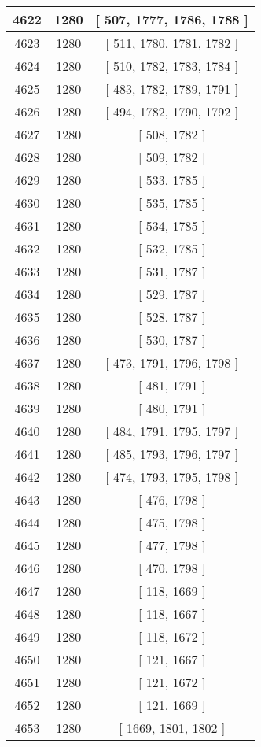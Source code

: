 \begin{center}
\begin{longtable}[H]{|| c c c ||}
4622 & 1280 & [ 507, 1777, 1786, 1788 ] \\ 
\hline
4623 & 1280 & [ 511, 1780, 1781, 1782 ] \\ 
\hline
4624 & 1280 & [ 510, 1782, 1783, 1784 ] \\ 
\hline
4625 & 1280 & [ 483, 1782, 1789, 1791 ] \\ 
\hline
4626 & 1280 & [ 494, 1782, 1790, 1792 ] \\ 
\hline
4627 & 1280 & [ 508, 1782 ] \\ 
\hline
4628 & 1280 & [ 509, 1782 ] \\ 
\hline
4629 & 1280 & [ 533, 1785 ] \\ 
\hline
4630 & 1280 & [ 535, 1785 ] \\ 
\hline
4631 & 1280 & [ 534, 1785 ] \\ 
\hline
4632 & 1280 & [ 532, 1785 ] \\ 
\hline
4633 & 1280 & [ 531, 1787 ] \\ 
\hline
4634 & 1280 & [ 529, 1787 ] \\ 
\hline
4635 & 1280 & [ 528, 1787 ] \\ 
\hline
4636 & 1280 & [ 530, 1787 ] \\ 
\hline
4637 & 1280 & [ 473, 1791, 1796, 1798 ] \\ 
\hline
4638 & 1280 & [ 481, 1791 ] \\ 
\hline
4639 & 1280 & [ 480, 1791 ] \\ 
\hline
4640 & 1280 & [ 484, 1791, 1795, 1797 ] \\ 
\hline
4641 & 1280 & [ 485, 1793, 1796, 1797 ] \\ 
\hline
4642 & 1280 & [ 474, 1793, 1795, 1798 ] \\ 
\hline
4643 & 1280 & [ 476, 1798 ] \\ 
\hline
4644 & 1280 & [ 475, 1798 ] \\ 
\hline
4645 & 1280 & [ 477, 1798 ] \\ 
\hline
4646 & 1280 & [ 470, 1798 ] \\ 
\hline
4647 & 1280 & [ 118, 1669 ] \\ 
\hline
4648 & 1280 & [ 118, 1667 ] \\ 
\hline
4649 & 1280 & [ 118, 1672 ] \\ 
\hline
4650 & 1280 & [ 121, 1667 ] \\ 
\hline
4651 & 1280 & [ 121, 1672 ] \\ 
\hline
4652 & 1280 & [ 121, 1669 ] \\ 
\hline
4653 & 1280 & [ 1669, 1801, 1802 ] \\ 

\end{longtable}
\end{center}
